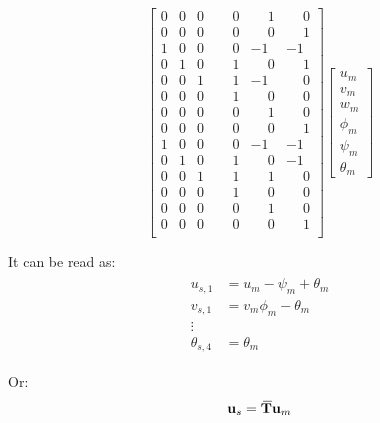 \documentclass[10pt,b5paper,titlepage]{book}
\newcommand{\m}{\mathbf}
\newcommand{\closure}[2][3]{%
{}\mkern#1mu\overline{\mkern-#1mu#2}}
\newenvironment{eqarray}
{
    \begin{eqnarray}
        \begin{aligned}
}
{
        \end{aligned}
    \end{eqnarray}
}
\begin{document}
\begin{equation}
\begin{bmatrix}
        0 & 0 & 0 & \phantom{-}0 & \phantom{-}1 & \phantom{-}0 \\
        0 & 0 & 0 & \phantom{-}0 & \phantom{-}0 & \phantom{-}1 \\
        1 & 0 & 0 & \phantom{-}0 & -1 & -1 \\
        0 & 1 & 0 & \phantom{-}1 & \phantom{-}0 & \phantom{-}1 \\
        0 & 0 & 1 & \phantom{-}1 & -1 & \phantom{-}0 \\
        0 & 0 & 0 & \phantom{-}1 & \phantom{-}0 & \phantom{-}0 \\
        0 & 0 & 0 & \phantom{-}0 & \phantom{-}1 & \phantom{-}0 \\
        0 & 0 & 0 & \phantom{-}0 & \phantom{-}0 & \phantom{-}1 \\
        1 & 0 & 0 & \phantom{-}0 & -1 & -1 \\
        0 & 1 & 0 & \phantom{-}1 & \phantom{-}0 & -1 \\
        0 & 0 & 1 & \phantom{-}1 & \phantom{-}1 & \phantom{-}0 \\
        0 & 0 & 0 & \phantom{-}1 & \phantom{-}0 & \phantom{-}0 \\
        0 & 0 & 0 & \phantom{-}0 & \phantom{-}1 & \phantom{-}0 \\
        0 & 0 & 0 & \phantom{-}0 & \phantom{-}0 & \phantom{-}1 \\
    \end{bmatrix}
    \begin{bmatrix}
        u_m \\
        v_m \\
        w_m \\
        \phi_m \\
        \psi_m \\
        \theta_m
    \end{bmatrix}
\end{equation}

It can be read as:
\begin{eqarray}
    u_{s,1} &= u_m -\psi_m + \theta_m \\
    v_{s,1} &= v_m \phi_m - \theta_m \\
    \vdots \\
    \theta_{s,4} &= \theta_m
\end{eqarray}

Or:
\begin{equation}\label{rbe2-coefficients}
    \m{u}_s = \m{\closure{T}} \m{u}_m
\end{equation}
\end{document}
